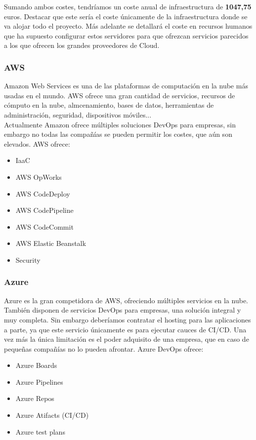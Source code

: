 \begin{paragraph}
			Sumando ambos costes, tendríamos un coste anual de infraestructura de \textbf{1047,75} euros. Destacar que este sería el coste únicamente de la infraestructura donde se va alojar todo el proyecto. Más adelante se detallará el coste en recursos humanos que ha supuesto configurar estos servidores para que ofrezcan servicios parecidos a los que ofrecen los grandes proveedores de Cloud.
			
			\end{paragraph}
		\subsubsection{AWS}
			\begin{paragraph}
				Amazon Web Services es una de las plataformas de computación en la nube más usadas en el mundo. 
				AWS ofrece una gran cantidad de servicios, recursos de cómputo en la nube, almcenamiento, bases de datos, herramientas de administración, seguridad, dispositivos móviles... \\
				Actualmente Amazon ofrece múltiples soluciones DevOps para empresas, sin embargo no todas las compañías se pueden permitir los costes, que aún son elevados. AWS ofrece:
				
				\begin{itemize}
					\item IaaC
					\item AWS OpWorks
					\item AWS CodeDeploy	
					\item AWS CodePipeline
					\item AWS CodeCommit
					\item AWS Elastic Beanstalk
					\item Security
				\end{itemize}
				
			\end{paragraph}
		
		\subsubsection{Azure}
			\begin{paragraph}
				Azure es la gran competidora de AWS, ofreciendo múltiples servicios en la nube. También disponen de servicios DevOps \cite{AzureDev63:online} para empresas, una solución integral y muy completa. Sin embargo deberíamos contratar el hosting para las aplicaciones a parte, ya que este servicio únicamente es para ejecutar cauces de CI/CD. Una vez más la única limitación es el poder adquisito de una empresa, que en caso de pequeñas compañías no lo pueden afrontar. Azure DevOps ofrece:
				\begin{itemize}
					\item Azure Boards
					\item Azure Pipelines
					\item Azure Repos
					\item Azure Atifacts (CI/CD)
					\item Azure test plans
				\end{itemize}
			\end{paragraph}
		

